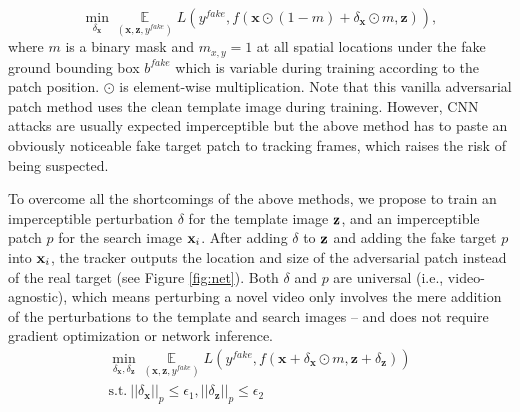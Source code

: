 \documentclass[journal]{IEEEtran}
\newcommand{\ie}{i.e.}
\begin{document}
\begin{equation}
    \min\limits_{\delta_\textbf{x}} \mathop{\mathbb{E}}\limits_{(\textbf{x}, \textbf{z}, y^{fake})} L(y^{fake}, f(\textbf{x}\odot (1-m) + \delta_\textbf{x}\odot m, \textbf{z})),
\end{equation}
where $m$ is a binary mask and $m_{x,y}=1$ at all spatial locations under the fake ground bounding box $b^{fake}$ which is variable during training according to the patch position. $\odot$ is element-wise multiplication. Note that this vanilla adversarial patch method uses the clean template image during training. However, CNN attacks are usually expected imperceptible but the above method has to paste an obviously noticeable fake target patch to tracking frames, which raises the risk of being suspected.

To overcome all the shortcomings of the above methods, we propose to train an imperceptible perturbation $\delta$ for the template image $\textbf z$, and an imperceptible patch $p$ for the search image $\textbf x_i$. After adding $\delta$ to $\textbf z$ and adding the fake target $p$ into $\textbf x_i$, the tracker outputs the location and size of the adversarial patch instead of the real target (see Figure \ref{fig:net}). Both $\delta$ and $p$ are universal (\ie, video-agnostic), which means perturbing a novel video only involves the mere addition of the perturbations to the template and search images -- and does not require gradient optimization or network inference.
\begin{equation}
  \begin{gathered}
    \min\limits_{\delta_\textbf{x}, \delta_\textbf{z}} \mathop{\mathbb{E}}\limits_{(\textbf{x}, \textbf{z}, y^{fake})} L(y^{fake}, f(\textbf{x} + \delta_\textbf{x}\odot m, \textbf{z} + \delta_\textbf{z}))\\
    \text{s.t.}\ ||\delta_\textbf{x}||_p \le \epsilon_1, ||\delta_\textbf{z}||_p \le \epsilon_2
  \end{gathered}
\end{equation}
\end{document}
